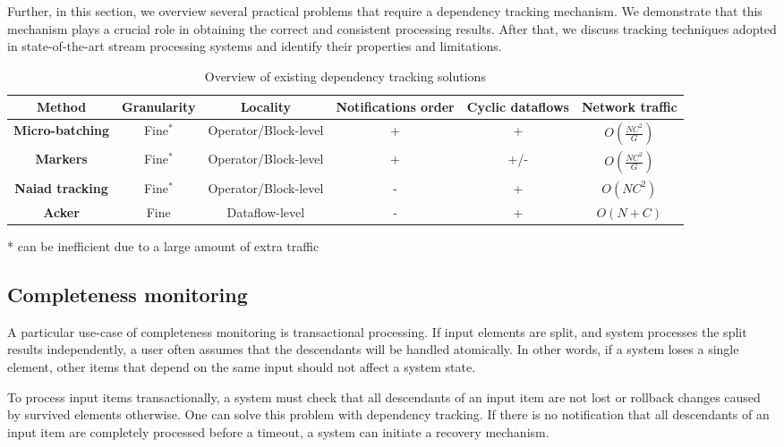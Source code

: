 Further, in this section, we overview several practical problems that require a dependency tracking mechanism. We demonstrate that this mechanism plays a crucial role in obtaining the correct and consistent processing results. After that, we discuss tracking techniques adopted in state-of-the-art stream processing systems and identify their properties and limitations. 

\begin{table*}
    \caption{Overview of existing dependency tracking solutions}
    \label{solutions-overview-table}
    \begin{threeparttable}
        \centering
        \begin{tabular}{|>{\bfseries}c|c|c|c|c|c|} 
          \hline
          Method & Granularity & Locality & Notifications order & Cyclic dataflows & Network traffic  \\ \hline \hline
          Micro-batching & Fine$^*$ & Operator/Block-level & + & + & $O(\frac{NC^2}{G})$ \\ \hline
          Markers & Fine$^*$ & Operator/Block-level & + & +/- & $O(\frac{NC^2}{G})$ \\ \hline
          Naiad tracking & Fine$^*$ & Operator/Block-level & - & + & $O(NC^2)$ \\ \hline
          Acker & Fine & Dataflow-level & - & + & $O(N+C)$ \\ \hline
        \end{tabular}
        * can be inefficient due to a large amount of extra traffic
    \end{threeparttable}
\end{table*}

\subsection{Completeness monitoring}

A particular use-case of completeness monitoring is transactional processing. If input elements are split, and system processes the split results independently, a user often assumes that the descendants will be handled atomically. In other words, if a system loses a single element, other items that depend on the same input should not affect a system state. 

To process input items transactionally, a system must check that all descendants of an input item are not lost or rollback changes caused by survived elements otherwise. One can solve this problem with dependency tracking. If there is no notification that all descendants of an input item are completely processed before a timeout, a system can initiate a recovery mechanism.

